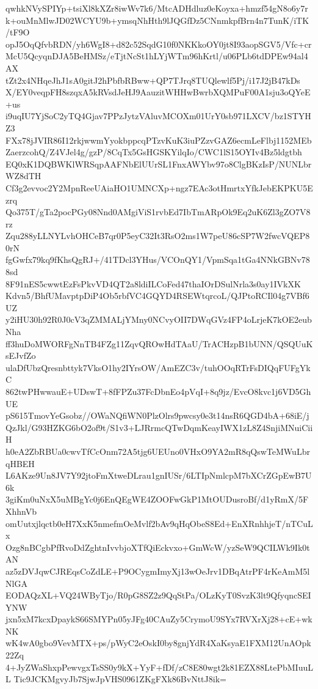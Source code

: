 qwhkNVySPIYp+tsiXl8kXZr8iwWv7k6/MtcADHdluz0eKoyxa+hmzf54gN8o6y7r
k+ouMnMlwJD02WCYU9b+ymsqNhHth9lJQGfDz5CNnmkpfBrn4n7TunK/iTK/tF9O
opJ5OqQfvbRDN/yh6WgI8+d82c52SqdG10f0NKKkoOY0jt8I93aopSGV5/Vfc+cr
McU5QcyqnDJA5BeHMSz/eTjtNcSt1hLYjWTm96hKrtl/u06PLb6tdDPEw94al4AX
tZt2x4NHqeJhJ1sA0gitJ2hPbfbRBww+QP7TJrq8TUQlewlf5Pj/i17J2jB47kDs
X/EY0veqpFH8szqxA5kRVsdJeHJ9AauzitWHHwBwrbXQMPuF00A1sju3oQYeE+us
i9uqIU7YjSoC2yTQ4Gjav7PPzJytzVAluvMCOXm01UrY0sb971LXCV/bz1STYHZ3
FXx78jJVIR86I12rkjwwmYyokbppcqPTzvKuK3iuPZzvGAZ6ecmLeFlbj1152MEb
ZaerzcohQ/Z4VJel4g/gzP/8CqTx5GsHGSKYilqIo/CWC1lS15OYIv4Bz5ldgtbh
EQ0xK1DQBWKlWRSqpAAFNbElUUrSL1FnxAWYbv97o8ClgBKzIsP/NUNLbrWZ8dTH
Cf3g2evvoc2Y2MpnReeUAiaHO1UMNCXp+ngz7EAc3otHmrtxYfkJebEKPKU5Ezrq
Qo375T/gTa2pocPGy08Nnd0AMgiViS1rvbEd7IbTmARpOk9Eq2uK6Zl3gZO7V8rz
Zqu288yLLNYLvhOHCeB7qr0P5eyC32It3RsO2ms1W7peU86cSP7W2fwcVQEP80rN
fgGwfx79kq9fKhsQgRJ+/41TDcl3YHus/VCOnQY1/VpmSqa1tGa4NNkGBNv788sd
8F91nES5cwwtEzFsPkvVD4QT2a8ldiILCoFed47thaIOrDSulNrla3s0ay1IVkXK
Kdvn5/BhfUMavptpDiP4Ob5rbfVC4GQYD4RSEWtqrcoL/QJPtoRCIl04g7VBf6UZ
y2iHU30h92R0J0cV3qZMMALjYMny0NCvyOII7DWqGVz4FP4oLrjeK7kOE2eubNha
ff3huDoMWORFgNnTB4FZg11ZqvQROwHdTAaU/TrACHzpB1bUNN/QSQUuKsEJvfZo
ulaDfUbzQresnbttyk7VksO1hy2IYrsOW/AmEZC3v/tuhOOqRTrFsDIQqFUFgYkC
862twPHwwauE+UDswT+8fFPZu37FcDbnEo4pVqI+8q9jz/EvcO8kvc1j6VD5GhUE
pS615TmovYeGsobz//OWaNQfiWN0PlzOlrs9pwcsy0e3t14nsR6QGD4bA+68iE/j
QzJkl/G93HZKG6bO2of9t/S1v3+LJRrmcQTwDqmKeayIWX1zL8Z4SnjiMNuiCiiH
h0eA2ZbRBUa0cwvTfCcOnm72A5tjg6UEUno0VHxO9YA2mR8qQswTeMWuLbrqHBEH
L6AKze9Un8JV7Y92jtoFmXtweDLrau1gnIUSr/6LTIpNmlcpM7bXCrZGpEwB7U6k
3giKm0uNxX5uMBgYc0j6EnQEgWE4ZOOFwGkP1MtOUDusroBf/d1yRmX/5FXhhnVb
omUutxjlqctb0eH7XxK5nmefmOeMvlf2bAv9qHqObeS8Ed+EnXRnhhjeT/nTCuLx
Ozg8nBCgbPfRvoDdZghtnIvvbjoXTfQiEckvxo+GmWcW/yzSeW9QCILWk9Ik0tAN
az5zDVJqwCJREqsCoZdLE+P9OCygmImyXj13wOeJrv1DBqAtrPF4rKeAmM5lNlGA
EODAQzXL+VQ24WByTjo/R0pG8SZ2z9QqStPa/OLzKyT0SvzK3lt9QfyqncSEIYNW
jxn5xM7kcxDpaykS66SMYPn05yJFg40CAuZy5CrymoU9SYx7RVXrXj28+cE+wkNK
wK4wA0gbo9VevMTX+ps/pWyC2eOskI0by8gnjYdR4XaKsyaE1FXM12UnAOpk22Zq
4+JyZWaShxpPewvgxTsSS0y9kX+YyF+fDf/zC8E80wgt2k81EZX88LtePbMIuuLL
Tic9JCKMgvyJb7SjwJpVHS0961ZKgFXk86BvNttJ8ik=

